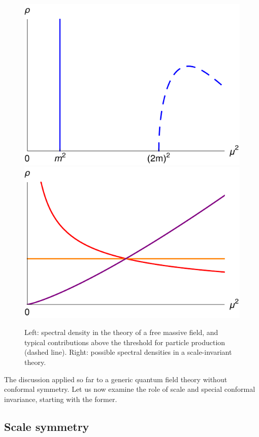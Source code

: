 \documentclass[a4paper,12pt]{article}
\numberwithin{equation}{section}
\begin{document}
\begin{figure}
	\includegraphics[width=0.48\linewidth]
		{figures/spectraldensity_massive.pdf}
	\hfill
	\includegraphics[width=0.48\linewidth]
		{figures/spectraldensity_conformal.pdf}
	\caption{Left: spectral density in the theory of a free massive
	field, and typical contributions above the threshold
	for particle production (dashed line).
	Right: possible spectral densities in a scale-invariant theory.}
	\label{fig:spectraldensity}
\end{figure}

The discussion applied so far to a generic quantum field theory without conformal symmetry. Let us now examine the role of scale and special conformal invariance, starting with the former.


\subsection{Scale symmetry}
\end{document}
